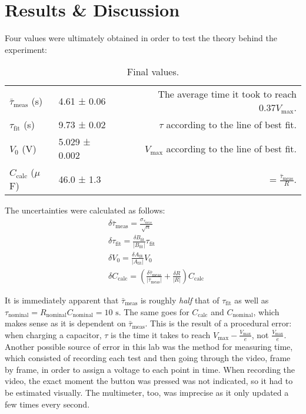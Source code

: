 \documentclass{article}
\begin{document}
\section{Results \& Discussion}
	Four values were ultimately obtained in order to test the theory behind the experiment:\\
	
	\begin{table}[H]
		\centering
		\caption{Final values.}
		\begin{tabular}{@{}l|lr@{}}
			\toprule
			$\bar{\tau}_\mathrm{meas}$ (s)   & 4.61 ± 0.06 & The average time it took to reach $0.37V_\mathrm{max}$. \\
			$\tau_\mathrm{fit}$ (s) & 9.73 ± 0.02   & $\tau$ according to the line of best fit.           \\
			$V_0$ (V)               & 5.029 ± 0.002 & $V_\mathrm{max}$ according to the line of best fit. \\
			$C_\mathrm{calc}$ ($\mu$F) & 46.0 ± 1.3  & $= \frac{\bar{\tau}_\mathrm{meas}}{R}$.   \\ \bottomrule
		\end{tabular}
	\end{table}
	
	The uncertainties were calculated as follows:
	\begin{align*}
		&\delta\bar{\tau}_\mathrm{meas} = \frac{\sigma_{\tau_\mathrm{meas}}}{\sqrt{n}}\\
		&\delta\tau_\mathrm{fit}  = \frac{\delta B_\mathrm{fit}}{|B_\mathrm{fit}|}\tau_\mathrm{fit}\\
		&\delta V_0				 = \frac{\delta A_\mathrm{fit}}{|A_\mathrm{fit}|}V_0\\
		&\delta C_\mathrm{calc}	 = \left(\frac{\delta\bar{\tau}_\mathrm{meas}}{|\bar{\tau}_\mathrm{meas}|} + \frac{\delta R}{|R|}\right)C_\mathrm{calc}
	\end{align*}
	
	It is immediately apparent that $\bar{\tau}_\mathrm{meas}$ is roughly \emph{half} that of $\tau_\mathrm{fit}$ as well as $\tau_\mathrm{nominal} = R_\mathrm{nominal}C_\mathrm{nominal} = 10 \text{ s}$.
	The same goes for $C_\mathrm{calc}$ and $C_\mathrm{nominal}$, which makes sense as it is dependent on $\bar{\tau}_\mathrm{meas}$.
	This is the result of a procedural error: when charging a capacitor, $\tau$ is the time it takes to reach $V_\mathrm{max} - \frac{V_\mathrm{max}}{e}$, not $\frac{V_\mathrm{max}}{e}$.
	Another possible source of error in this lab was the method for measuring time, which consisted of recording each test and then going through the video, frame by frame, in order to assign a voltage to each point in time.
	When recording the video, the exact moment the button was pressed was not indicated, so it had to be estimated visually. The multimeter, too, was imprecise as it only updated a few times every second.
	
\end{document}
